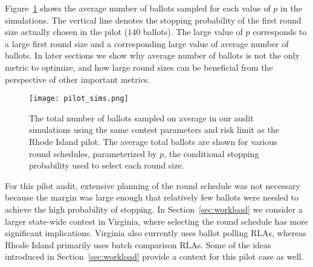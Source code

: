 Figure~\ref{fig:pilot_sims} shows the average number of ballots sampled for each value of $p$ in the simulations. The vertical line denotes the stopping probability of the first round size actually chosen in the pilot ($140$ ballots). The large value of $p$ corresponds to a large first round size and a corresponding large value of average number of ballots. In later sections we show why average number of ballots is not the only metric to optimize, and how large round sizes can be beneficial from the perspective of other important metrics. 

\begin{figure}
\texttt{[image: pilot\_sims.png]}
\caption{The total number of ballots sampled on average in our audit simulations using the same contest parameters and risk limit as the Rhode Island pilot. The average total ballots are shown for various round schedules, parameterized by $p$, the conditional stopping probability used to select each round size.}
\label{fig:pilot_sims}
\end{figure}


For this pilot audit, extensive planning of the round schedule was not necessary because the margin was large enough that relatively few ballots were needed to achieve the high probability of stopping. In Section~\ref{sec:workload} we consider a larger state-wide contest in Virginia, where selecting the round schedule has more significant implications. Virginia also currently uses ballot polling RLAs, whereas Rhode Island primarily uses batch comparison RLAs. Some of the ideas introduced in Section~\ref{sec:workload} provide a context for this pilot case as well.

